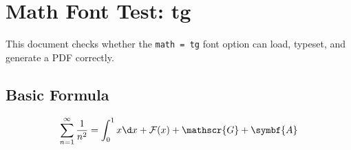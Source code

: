 \documentclass[lang = en, math = tg, font = none, mode = simple]{elegantbook-l3}
\begin{document}
\frontmatter
\tableofcontents

\mainmatter
\chapter{Math Font Test: tg}

This document checks whether the \texttt{math = tg} font option can load,
typeset, and generate a PDF correctly.

\section{Basic Formula}

\[
  \sum_{n=1}^{\infty} \frac{1}{n^2}
  =
  \int_0^1 x\d x + \mathcal{F}(x) + \mathscr{G} + \symbf{A}
\]
\end{document}
